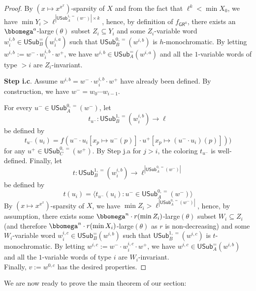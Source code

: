 \documentclass{article}
\numberwithin{theorem}{section}
\newcommand{\GR}{\mathsf{GR}}
\newcommand{\USub}{\mathsf{USub}}
\begin{document}
\begin{proof}
By $(x \mapsto x^{x^x})$-sparsity of $X$ and from the fact that $\ell^k < \min X_0$, we have $\min Y_i > \ell^{|\USub_A^{1,=}(w^-)| \times k}$, hence, by definition of $f_{\GR^0}$, there exists an  $\bbomega^{a}$-large$(\theta)$ subset $Z_i \subseteq Y_i$ and some $Z_i$-variable word $w_i^{i,b} \in \USub_B^=(w^{i,a}_i)$ such that $\USub_{B}^{0,=}(w^{i,b})$ is $h$-monochromatic. By letting $w^{i,b} := w^- \cdot w_i^{i,b} \cdot w^+$, we have $w^{i,b} \in \USub_A^=(w^{i,a})$ and all the $1$-variable words of type $>i$ are $Z_i$-invariant.
\smallskip

\noindent
\textbf{Step i.c}. Assume $w^{i,b} = w^- \cdot w^{i,b}_{i} \cdot w^+$ have already been defined. By construction, we have $w^- = w_0 \cdots w_{i-1}$.

For every $u^- \in \USub_A^{0,=}(w^-)$, let $$t_{u^-} : \USub_{B}^{1,=}(w_i^{i,b}) \to \ell$$ be defined by $$t_{u^-}(u_i) = f(u^- \cdot u_i[x_p \mapsto u^-(p)] \cdot u^+[x_p \mapsto (u^- \cdot u_i)(p)]))$$
for any $u^+ \in \USub_{C}^{0,=}(w^+)$. By Step j.a for $j > i$, the coloring $t_{u^-}$ is well-defined.
Finally, let 
$$t : \USub_{B}^{1,=}(w_i^{i,b}) \to \ell^{|\USub_A^{0,=}(w^-)|}$$
be defined by $$t(u_i) = \langle t_{u^-}(u_i) : u^- \in \USub_A^{0,=}(w^-) \rangle$$
By $(x \mapsto x^{x^x})$-sparsity of $X$, we have $\min Z_i > \ell^{|\USub_A^{0,=}(w^-)|}$, hence, by assumption, there exists some $\bbomega^n\cdot r(\min Z_i)$-large$(\theta)$ subset $W_i \subseteq Z_i$ (and therefore $\bbomega^n\cdot r(\min X_i)$-large$(\theta)$ as $r$ is non-decreasing) and some $W_i$-variable word $w_i^{i,c} \in \USub_B^=(w^{i,b})$ such that $\USub_{B}^{1,=}(w^{i,c})$ is $t$-monochromatic. By letting $w^{i,c} := w^- \cdot w_i^{i,c} \cdot w^+$, we have $w^{i,c} \in \USub_A^=(w^{i,b})$ and all the $1$-variable words of type $i$ are $W_i$-invariant. \\

Finally, $v := w^{0,c}$ has the desired properties.
\end{proof}

We are now ready to prove the main theorem of our section:
\end{document}
